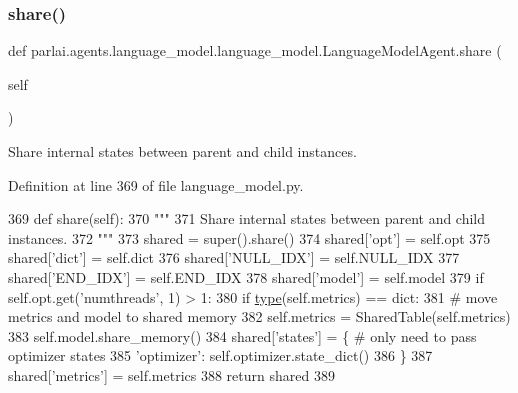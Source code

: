 \subsubsection{\texorpdfstring{share()}{share()}}
{\footnotesize\ttfamily def parlai.\+agents.\+language\+\_\+model.\+language\+\_\+model.\+Language\+Model\+Agent.\+share (\begin{DoxyParamCaption}\item[{}]{self }\end{DoxyParamCaption})}

\begin{DoxyVerb}Share internal states between parent and child instances.
\end{DoxyVerb}
 

Definition at line 369 of file language\+\_\+model.\+py.


\begin{DoxyCode}
369     \textcolor{keyword}{def }share(self):
370         \textcolor{stringliteral}{"""}
371 \textcolor{stringliteral}{        Share internal states between parent and child instances.}
372 \textcolor{stringliteral}{        """}
373         shared = super().share()
374         shared[\textcolor{stringliteral}{'opt'}] = self.opt
375         shared[\textcolor{stringliteral}{'dict'}] = self.dict
376         shared[\textcolor{stringliteral}{'NULL\_IDX'}] = self.NULL\_IDX
377         shared[\textcolor{stringliteral}{'END\_IDX'}] = self.END\_IDX
378         shared[\textcolor{stringliteral}{'model'}] = self.model
379         \textcolor{keywordflow}{if} self.opt.get(\textcolor{stringliteral}{'numthreads'}, 1) > 1:
380             \textcolor{keywordflow}{if} \hyperlink{namespaceparlai_1_1agents_1_1tfidf__retriever_1_1build__tfidf_ad5dfae268e23f506da084a9efb72f619}{type}(self.metrics) == dict:
381                 \textcolor{comment}{# move metrics and model to shared memory}
382                 self.metrics = SharedTable(self.metrics)
383                 self.model.share\_memory()
384             shared[\textcolor{stringliteral}{'states'}] = \{  \textcolor{comment}{# only need to pass optimizer states}
385                 \textcolor{stringliteral}{'optimizer'}: self.optimizer.state\_dict()
386             \}
387         shared[\textcolor{stringliteral}{'metrics'}] = self.metrics
388         \textcolor{keywordflow}{return} shared
389 
\end{DoxyCode}
\mbox{\label{classparlai_1_1agents_1_1language__model_1_1language__model_1_1LanguageModelAgent_ab7b37ff49b1ce04ef7ce0e598cf736e3}} 
